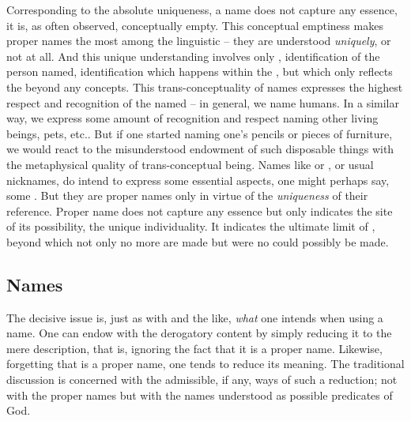 \pa
Corresponding to the absolute uniqueness, a name does not capture any
essence, it is, as often observed, conceptually empty.
%
%
This conceptual emptiness makes proper names the most  among the
linguistic  -- they are understood {\em uniquely}, or not at all. And
this unique understanding involves only , identification of the person
named, identification which happens within the \hoa, but which only reflects the
 beyond any concepts.  This trans-conceptuality of names expresses the
highest respect and recognition of the named -- in general, we name humans. In a
similar way, we express some amount of recognition and respect naming other
living beings, pets, etc.. But if one started naming one's pencils or pieces of
furniture, we would react to the misunderstood endowment of such disposable
things with the metaphysical quality of trans-conceptual being.  Names like  or
, or usual {nicknames}, do intend to express some essential
aspects, one might perhaps say, some . But they are proper names
only in virtue of the {\em uniqueness} of their reference.  Proper name does not
capture any essence but only indicates the site of its possibility, the unique
individuality.  It indicates the ultimate limit of , beyond
which not only no more  are made but were no 
could possibly be made.


\subsection{Names}\label{names}
The decisive issue is, just as with  and the like, {\em what}
one intends when using a name. One can endow  with the derogatory
content by simply reducing it to the mere description, that is, ignoring the
fact that it is a proper name. Likewise, forgetting that  is a proper
name, one tends to reduce its meaning. The traditional discussion is concerned
with the admissible, if any, ways of such a reduction; not with the proper names
but with the names understood as possible predicates of God.

